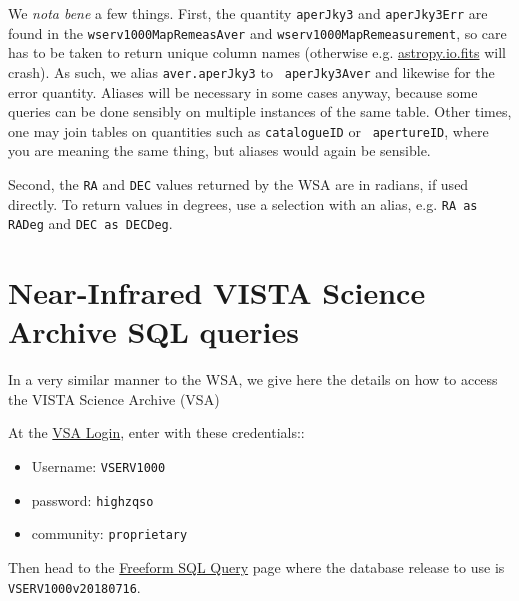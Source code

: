 \documentclass[usenatbib]{mnras}
\begin{document}
We {\it nota bene} a few things. First, the quantity {\tt aperJky3}
and {\tt aperJky3Err} are found in the {\tt wserv1000MapRemeasAver}
and {\tt wserv1000MapRemeasurement}, so care has to be taken to return
unique column names (otherwise e.g.
\href{http://docs.astropy.org/en/stable/io/fits/}{astropy.io.fits}
will crash).  As such, we alias {\tt aver.aperJky3} to {\tt
aperJky3Aver} and likewise for the error quantity. Aliases will be
necessary in some cases anyway, because some queries can be done
sensibly on multiple instances of the same table. Other times, one may
join tables on quantities such as {\tt catalogueID} or {\tt
apertureID}, where you are meaning the same thing, but aliases would
again be sensible.

Second, the {\tt RA} and {\tt DEC} values returned by the WSA are in radians, if
used directly. To return values in degrees, use a selection with an alias, e.g. 
{\tt RA as RADeg} and {\tt DEC as DECDeg}.

\onecolumn

\twocolumn


\section{Near-Infrared VISTA Science Archive SQL queries}\label{sec:SQL}
In a very similar manner to the WSA, we give here the details on how to access
the VISTA Science Archive (VSA)

At the \href{http://horus.roe.ac.uk/vsa/login.html}{VSA Login}, enter 
with these credentials::
\begin{itemize}
    \item Username: {\tt VSERV1000} 
    \item password: {\tt highzqso} 
    \item community: {\tt proprietary}
\end{itemize}
Then head to the \href{http://horus.roe.ac.uk:8080/vdfs/VSQL_form.jsp}{Freeform SQL Query} page where the database release to use is {\tt VSERV1000v20180716}. 

%






%
%


\end{document}
